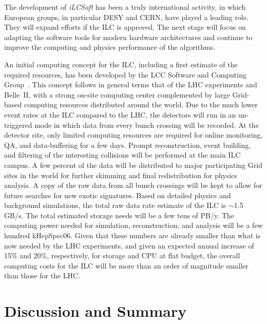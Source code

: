 \documentclass[%
reprint,
 floatfix,
 amsmath,amssymb,
 aps,
]{revtex4-1}
\begin{document}
The development of \emph{iLCSoft} has been 
 a truly international activity, in which European groups, in particular DESY and
CERN, have played a leading role.  They 
will expand efforts if the ILC is approved.  The next stage
will 
focus on adapting the software tools for
 modern hardware architectures and continue to
improve the computing and physics performance of the algorithms.


An initial computing concept for the ILC, including a first estimate of the required resources, has been developed by the LCC Software and Computing Group~\cite{bib:lcc_computing}.
This concept follows in general terms that of the LHC experiments and
Belle~II,  with a strong on-site computing center complemented by large
Grid-based computing resources distributed around the world. Due to the much lower event rates at the ILC compared to the LHC, 
the detectors will run in an un-triggered mode in which  data from every bunch crossing will be recorded. At the detector site,  only limited computing
resources are required for online monitoring, QA, and data-buffering for a few
days.
 Prompt reconstruction, event building, and filtering of the interesting collisions
will be performed at the main ILC campus.
A few percent of the data will be distributed to major participating Grid sites
in the world for further skimming and final redistribution for physics
analysis. A copy of the raw data from all bunch crossings will be kept
to allow
 for future searches for new exotic signatures. 
Based on detailed physics and background simulations,
 the total raw data rate estimate of the ILC is $\sim$1.5 GB/s.
The total estimated storage needs will be a few tens of PB/y.
The computing power needed for simulation, reconstruction, and analysis will be a few hundred kHepSpec06.
Given that these numbers are already smaller than what is now
needed by the LHC experiments, and given an expected annual increase
of 15\% and 20\%, respectively, for storage and CPU
at flat budget, the overall computing costs for the ILC
will be more than an order of magnitude smaller than those for the LHC.

\vspace{-.4cm}

\section{\label{sec:discuss}Discussion and Summary}

\vspace{-.3cm}
\end{document}
